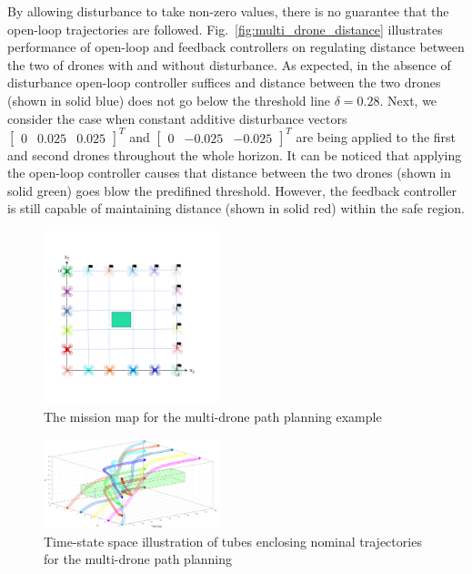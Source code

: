 By allowing disturbance to take non-zero values, there is no guarantee that the open-loop trajectories are followed. Fig.~\ref{fig:multi_drone_distance} illustrates performance of open-loop and feedback controllers on regulating distance between the two of drones with and without disturbance. As expected, in the absence of disturbance open-loop controller suffices and distance between the two drones (shown in solid blue) does not go below the threshold line $\delta=0.28$. Next, we consider the case when constant additive disturbance vectors $\begin{bmatrix}0 &0.025&0.025\end{bmatrix}^T$ and $\begin{bmatrix}0 &-0.025&-0.025\end{bmatrix}^T$ are being applied to the first and second drones throughout the whole horizon. It can be noticed that applying the open-loop controller causes that distance between the two drones (shown in solid green) goes blow the predifined threshold. However, the feedback controller is still capable of maintaining distance (shown in solid red) within the safe region.
\begin{figure}[t]
	\centering
	\includegraphics[width=0.45\textwidth]{figures/MA1.pdf}
	\caption{The mission map for the multi-drone path planning example}
	\label{fig:MA}
\end{figure}

\begin{figure}[t]
	\centering
	\includegraphics[width=0.45\textwidth]{figures/tubes10.eps}
	\caption{Time-state space illustration of tubes enclosing nominal trajectories for the multi-drone path planning}
	\label{fig:3dtubes}
\end{figure}

